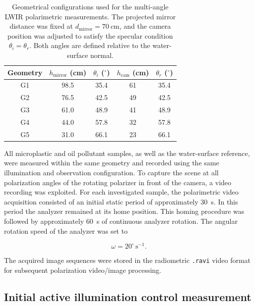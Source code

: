 \documentclass[pdflatex,sn-apa]{sn-jnl}
\begin{document}
\begin{table}[t]
\centering
\caption{Geometrical configurations used for the multi-angle LWIR polarimetric measurements. The projected mirror distance was fixed at $d_{\mathrm{mirror}}=70~\mathrm{cm}$, and the camera position was adjusted to satisfy the specular condition $\theta_i=\theta_r$. Both angles are defined relative to the water-surface normal.\\}
\label{tab:measurement_geometry}
\begin{tabular}{ccccc}
\toprule
Geometry & $h_{\mathrm{mirror}}$ (cm) & $\theta_i$ ($^\circ$) & $h_{\mathrm{cam}}$ (cm) & $\theta_r$ ($^\circ$) \\
\midrule
G1 & 98.5 & 35.4 & 61 & 35.4 \\
G2 & 76.5 & 42.5 & 49 & 42.5 \\
G3 & 61.0 & 48.9 & 41 & 48.9 \\
G4 & 44.0 & 57.8 & 32 & 57.8 \\
G5 & 31.0 & 66.1 & 23 & 66.1 \\
\bottomrule
\end{tabular}
\end{table}

All microplastic and oil pollutant samples, as well as the water-surface reference, were measured within the same geometry and recorded using the same illumination and observation configuration. To capture the scene at all polarization angles of the rotating polarizer in front of the camera, a video recording was exploited. For each investigated sample, the polarimetric video acquisition consisted of an initial static period of approximately 30~s. In this period the analyzer remained at its home position. This homing procedure was followed by approximately 60~s of continuous analyzer rotation. The angular rotation speed of the analyzer was set to

\begin{equation}
\omega = 20^{\circ}\,\mathrm{s}^{-1}.
\end{equation}

\noindent
The acquired image sequences were stored in the radiometric \texttt{.ravi} video format for subsequent polarization video/image processing.


\subsection{Initial active illumination control measurement}

\end{document}
